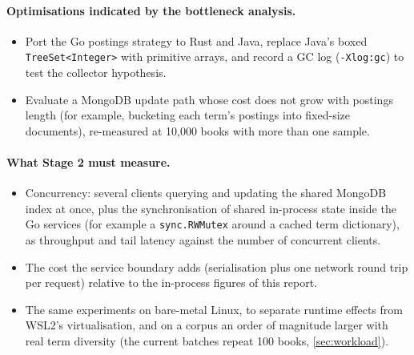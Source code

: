 \paragraph{Optimisations indicated by the bottleneck analysis.}
\begin{itemize}
    \item Port the Go postings strategy to Rust and Java, replace Java's
    boxed \texttt{TreeSet<Integer>} with primitive arrays, and record a GC
    log (\texttt{-Xlog:gc}) to test the collector hypothesis.
    \item Evaluate a MongoDB update path whose cost does not grow with
    postings length (for example, bucketing each term's postings into
    fixed-size documents), re-measured at 10{,}000 books with more than one
    sample.
\end{itemize}

\paragraph{What Stage 2 must measure.}
\begin{itemize}
    \item Concurrency: several clients querying and updating the shared
    MongoDB index at once, plus the synchronisation of shared in-process
    state inside the Go services (for example a \texttt{sync.RWMutex}
    around a cached term dictionary), as throughput and tail latency against
    the number of concurrent clients.
    \item The cost the service boundary adds (serialisation plus one network
    round trip per request) relative to the in-process figures of this
    report.
    \item The same experiments on bare-metal Linux, to separate runtime
    effects from WSL2's virtualisation, and on a corpus an order of magnitude
    larger with real term diversity (the current batches repeat 100 books,
    \cref{sec:workload}).
\end{itemize}
